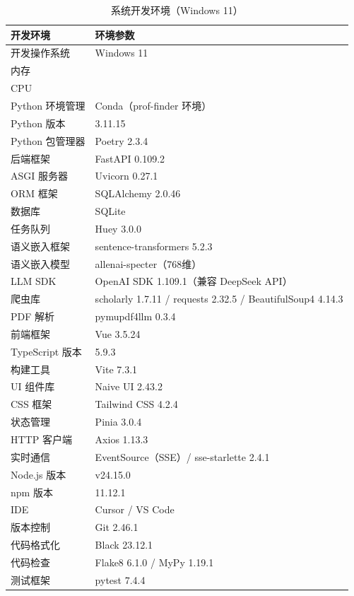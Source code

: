 \documentclass[11pt]{article}
\begin{document}
\begin{table}[htbp]
  \centering
  \caption{系统开发环境（Windows 11）}
  \begin{tabular}{ll}
    \toprule
    开发环境 & 环境参数 \\
    \midrule
    开发操作系统 & Windows 11 \\
    内存 & \\
    CPU & \\
    Python 环境管理 & Conda（prof-finder 环境） \\
    Python 版本 & 3.11.15 \\
    Python 包管理器 & Poetry 2.3.4 \\
    后端框架 & FastAPI 0.109.2 \\
    ASGI 服务器 & Uvicorn 0.27.1 \\
    ORM 框架 & SQLAlchemy 2.0.46 \\
    数据库 & SQLite \\
    任务队列 & Huey 3.0.0 \\
    语义嵌入框架 & sentence-transformers 5.2.3 \\
    语义嵌入模型 & allenai-specter（768维） \\
    LLM SDK & OpenAI SDK 1.109.1（兼容 DeepSeek API） \\
    爬虫库 & scholarly 1.7.11 / requests 2.32.5 / BeautifulSoup4 4.14.3 \\
    PDF 解析 & pymupdf4llm 0.3.4 \\
    前端框架 & Vue 3.5.24 \\
    TypeScript 版本 & 5.9.3 \\
    构建工具 & Vite 7.3.1 \\
    UI 组件库 & Naive UI 2.43.2 \\
    CSS 框架 & Tailwind CSS 4.2.4 \\
    状态管理 & Pinia 3.0.4 \\
    HTTP 客户端 & Axios 1.13.3 \\
    实时通信 & EventSource（SSE）/ sse-starlette 2.4.1 \\
    Node.js 版本 & v24.15.0 \\
    npm 版本 & 11.12.1 \\
    IDE & Cursor / VS Code \\
    版本控制 & Git 2.46.1 \\
    代码格式化 & Black 23.12.1 \\
    代码检查 & Flake8 6.1.0 / MyPy 1.19.1 \\
    测试框架 & pytest 7.4.4 \\
    \bottomrule
  \end{tabular}
  \label{tab:dev_env_windows}
\end{table}
\end{document}
